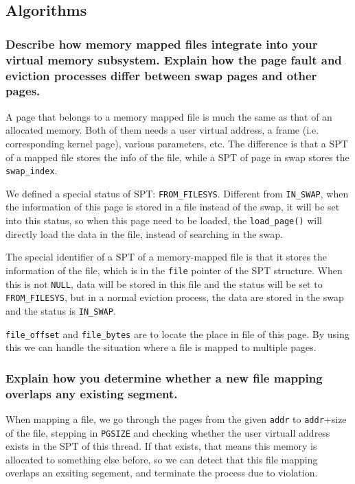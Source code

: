 \documentclass[sigconf, nonacm, balance=false, urlbreakonhyphens=true]{acmart}
\begin{document}
        \subsection{Algorithms}

            \subsubsection{Describe how memory mapped files integrate into your virtual memory subsystem.  Explain how the page fault and eviction processes differ between swap pages and other pages. } 

                A page that belongs to a memory mapped file is much the same as that of an allocated memory. Both of them needs a user virtual address, a frame (i.e. corresponding kernel page), various parameters, etc. The difference is that a SPT of a mapped file stores the info of the file, while a SPT of page in swap stores the \texttt{swap\_index}. 

                We defined a special status of SPT: \texttt{FROM\_FILESYS}. Different from \texttt{IN\_SWAP}, when the information of this page is stored in a file instead of the swap, it will be set into this status, so when this page need to be loaded, the \texttt{load\_page()} will directly load the data in the file, instead of searching in the swap. 

                The special identifier of a SPT of a memory-mapped file is that it stores the information of the file, which is in the \texttt{file} pointer of the SPT structure. When this is not \texttt{NULL}, data will be stored in this file and the status will be set to \texttt{FROM\_FILESYS}, but in a normal eviction process, the data are stored in the swap and the status is \texttt{IN\_SWAP}. 

                \texttt{file\_offset} and \texttt{file\_bytes} are to locate the place in file of this page. By using this we can handle the situation where a file is mapped to multiple pages. 

            \subsubsection{Explain how you determine whether a new file mapping overlaps any existing segment. }

                When mapping a file, we go through the pages from the given \texttt{addr} to \texttt{addr}+size of the file, stepping in \texttt{PGSIZE} and checking whether the user virtuall address exists in the SPT of this thread. If that exists, that means this memory is allocated to something else before, so we can detect that this file mapping overlaps an exsiting segement, and terminate the process due to violation. 
        
\end{document}
